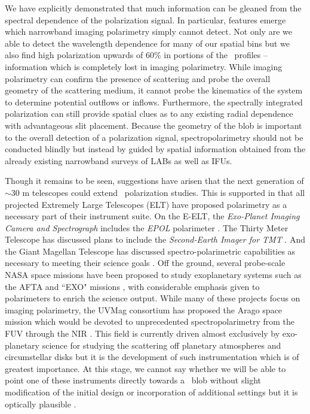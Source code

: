 We have explicitly demonstrated that much information can be gleaned from the spectral dependence of the polarization signal. In particular, features emerge which narrowband imaging polarimetry simply cannot detect. Not only are we able to detect the wavelength dependence for many of our spatial bins but we also find high polarization upwards of 60\% in portions of the \lya~profiles -- information which is completely lost in imaging polarimetry. While imaging polarimetry can confirm the presence of scattering and probe the overall geometry of the scattering medium, it cannot probe the kinematics of the system to determine potential outflows or inflows. Furthermore, the spectrally integrated polarization can still provide spatial clues as to any existing radial dependence with advantageous slit placement. Because the geometry of the blob is important to the overall detection of a polarization signal, spectropolarimetry should not be conducted blindly but instead by guided by spatial information obtained from the already existing narrowband surveys of LABs as well as IFUs. 

Though it remains to be seen, suggestions have arisen that the next generation of $\sim$30 m telescopes could extend \lya~polarization studies. This is supported in that all projected Extremely Large Telescopes (ELT) have proposed polarimetry as a necessary part of their instrument suite.  On the E-ELT, the \textit{Exo-Planet Imaging Camera and Spectrograph} \citep[\textit{EPICS},][]{Kasper2008} includes the \textit{EPOL} polarimeter \citep{Keller2010}.  The Thirty Meter Telescope has discussed plans to include the \textit{Second-Earth Imager for TMT} \citep{SEIT}. And the Giant Magellan Telescope has discussed spectro-polarimetric capabilities as necessary to meeting their science goals \citep{GMTscience}.  Off the ground, several probe-scale NASA space missions have been proposed to study exoplanetary systems such as the AFTA and ``EXO" missions \citep{Stapelfeldt2014, Seager2014}, with considerable emphasis given to polarimeters to enrich the science output. While many of these projects focus on imaging polarimetry, the UVMag consortium has proposed the Arago space mission which would be devoted to unprecedented spectropolarimetry from the FUV through the NIR \citep{Pertenais2014}.  This field is currently driven almost exclusively by exo-planetary science for studying the scattering off planetary atmospheres and circumstellar disks but it is the development of such instrumentation which is of greatest importance. At this stage, we cannot say whether we will be able to point one of these instruments directly towards a \lya~blob without slight modification of the initial design or incorporation of additional settings but it is optically plausible \citep{Hayes2011}.

